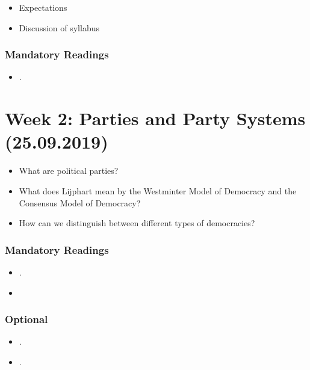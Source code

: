 \documentclass[abstract=on,parskip=full,headings=standardclasses,fontsize=11pt,paper=a4]{scrartcl}
\begin{document}
\begin{itemize}
\renewcommand\labelitemi{--}
\item Expectations
\item Discussion of syllabus
\end{itemize}


\subsubsection*{Mandatory Readings}
\begin{itemize}
\item {}.
\end{itemize}


\section{Week 2: Parties and Party Systems (25.09.2019)}

\begin{itemize}
\renewcommand\labelitemi{--}
\item  What are political parties?
\item What does Lijphart mean by the Westminter Model of Democracy and the Consensus Model of Democracy?
\item How can we distinguish between different types of democracies?
\end{itemize}

\subsubsection*{Mandatory Readings}
\begin{itemize}
\item {}.
\item {}
\end{itemize}



\subsubsection*{Optional}
\begin{itemize}
\item {}.
\item {}.
\end{itemize}
\end{document}
